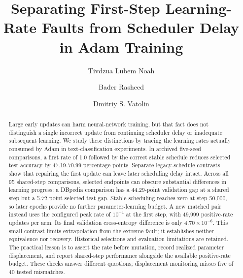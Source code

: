 \documentclass[smallextended]{svjour3}
\begin{document}
\title{Separating First-Step Learning-Rate Faults from Scheduler Delay in Adam Training}
\author{Tivdzua Lubem Noah \and Bader Rasheed \and Dmitriy S. Vatolin}
\date{}
\maketitle
\begin{abstract}
Large early updates can harm neural-network training, but that fact does not distinguish a single incorrect update from continuing scheduler delay or inadequate subsequent learning. We study these distinctions by tracing the learning rates actually consumed by Adam in text-classification experiments. In archived five-seed comparisons, a first rate of 1.0 followed by the correct stable schedule reduces selected test accuracy by 47.19-70.99 percentage points. Separate legacy-schedule contrasts show that repairing the first update can leave later scheduling delay intact. Across all 95 shared-step comparisons, selected endpoints can obscure substantial differences in learning progress: a DBpedia comparison has a 44.29-point validation gap at a shared step but a 5.72-point selected-test gap. Stable scheduling reaches zero at step 50,000, so later epochs provide no further parameter-learning budget. A new matched pair instead uses the configured peak rate of \(10^{-4}\) at the first step, with 49,999 positive-rate updates per arm. Its final validation cross-entropy difference is only \(4.70\times10^{-6}\). This small contrast limits extrapolation from the extreme fault; it establishes neither equivalence nor recovery. Historical selections and evaluation limitations are retained. The practical lesson is to assert the rate before mutation, record realized parameter displacement, and report shared-step performance alongside the available positive-rate budget. These checks answer different questions; displacement monitoring misses five of 40 tested mismatches.

\end{abstract}
\end{document}

